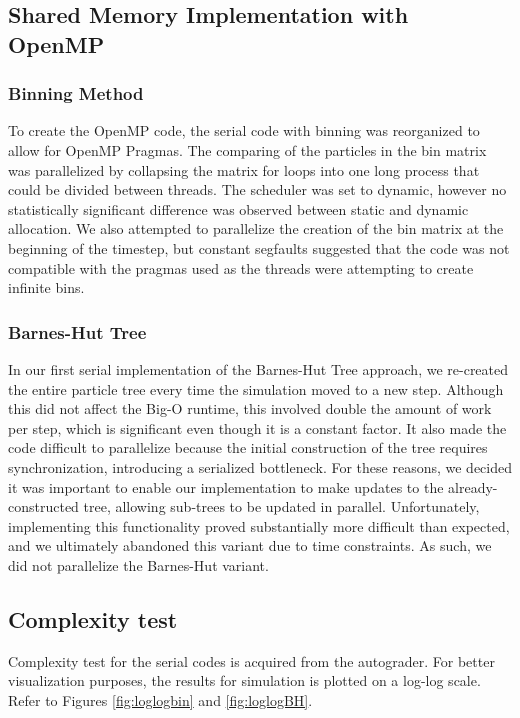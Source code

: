\documentclass{article}
\begin{document}
\subsection{Shared Memory Implementation with OpenMP}
\label{subsection:openmp}
\subsubsection{Binning Method}
To create the OpenMP code, the serial code with binning was reorganized to allow
for OpenMP Pragmas. The comparing of the particles in the bin matrix was
parallelized by collapsing the matrix for loops into one long process that could
be divided between threads. The scheduler was set to dynamic, however no
statistically significant difference was observed between static and dynamic
allocation. We also attempted to parallelize the creation of the bin matrix at
the beginning of the timestep, but constant segfaults suggested that the code
was not compatible with the pragmas used as the threads were attempting to
create infinite bins.
\subsubsection{Barnes-Hut Tree}
In our first serial implementation of the Barnes-Hut Tree approach, we
re-created the entire particle tree every time the simulation moved to a new
step. Although this did not affect the Big-O runtime, this involved double the
amount of work per step, which is significant even though it is a constant
factor. It also made the code difficult to parallelize because the initial
construction of the tree requires synchronization, introducing a serialized
bottleneck. For these reasons, we decided it was important to enable our
implementation to make updates to the already-constructed tree, allowing
sub-trees to be updated in parallel. Unfortunately, implementing this
functionality proved substantially more difficult than expected, and we
ultimately abandoned this variant due to time constraints. As such, we did not
parallelize the Barnes-Hut variant.

\subsection{Complexity test}
Complexity test for the serial codes is acquired from the autograder. For better
visualization purposes, the results for simulation is plotted on a log-log
scale. Refer to Figures \ref{fig:loglogbin} and \ref{fig:loglogBH}.
\end{document}

